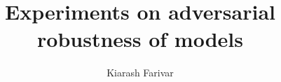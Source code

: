 \documentclass[a4paper,11pt,oneside]{article}
\title{Experiments on adversarial robustness of models}
\author{Kiarash Farivar}
\begin{document}
	
	
\maketitle

\listoftodos

\pagebreak 

\tableofcontents

\pagebreak 



\pagebreak 



\pagebreak 





\pagebreak







% 

% 

\pagebreak 



\pagebreak

\printbibliography
\end{document}
